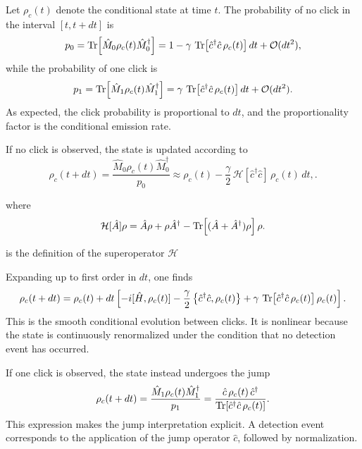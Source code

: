 Let \(\rho_c(t)\) denote the conditional state at time \(t\). The probability of no click in the interval \([t,t+dt]\) is
\begin{equation}
	p_0
	=
	\Tr\!\left[\hat M_0 \rho_c(t)\hat M_0^\dagger\right]
	=
	1-\gamma\,\Tr\!\left[\hat c^\dagger \hat c\,\rho_c(t)\right]dt
	+
	\mathcal{O}(dt^2),
	\label{eq:sme_photodetection_no_click_probability}
\end{equation}
while the probability of one click is
\begin{equation}
	p_1
	=
	\Tr\!\left[\hat M_1 \rho_c(t)\hat M_1^\dagger\right]
	=
	\gamma\,\Tr\!\left[\hat c^\dagger \hat c\,\rho_c(t)\right]dt
	+
	\mathcal{O}(dt^2).
	\label{eq:sme_photodetection_click_probability}
\end{equation}
As expected, the click probability is proportional to \(dt\), and the proportionality factor is the conditional emission rate.

If no click is observed, the state is updated according to
\begin{equation}
	\rho_c(t+dt)
	=
	\frac{\hat M_0 \rho_c(t)\hat M_0^\dagger}{p_0}
	\approx \rho_c(t) - \frac{\gamma}{2}\,\mathcal{H}[\hat c^\dagger \hat c]\,\rho_c(t)\,dt,
	.
	\label{eq:sme_photodetection_no_click_update_exact}
\end{equation}

where
\begin{equation}
	\mathcal{H}[\hat A]\rho
	=
	\hat A\rho+\rho \hat A^\dagger
	-
	\Tr\!\left[
	(\hat A+\hat A^\dagger)\rho
	\right]\rho.
	\label{eq:homodyne_H_superoperator_definition}
\end{equation}

is the definition of the superoperator $\mathcal{H}$

Expanding up to first order in \(dt\), one finds
\begin{equation}
	\rho_c(t+dt)
	=
	\rho_c(t)
	+
	dt
	\left[
	-i[\hat H,\rho_c(t)]
	-\frac{\gamma}{2}
	\left\{
	\hat c^\dagger \hat c,\rho_c(t)
	\right\}
	+
	\gamma\,\Tr\!\left[\hat c^\dagger \hat c\,\rho_c(t)\right]\rho_c(t)
	\right].
	\label{eq:sme_photodetection_no_click_update}
\end{equation}
This is the smooth conditional evolution between clicks. It is nonlinear because the state is continuously renormalized under the condition that no detection event has occurred.

If one click is observed, the state instead undergoes the jump
\begin{equation}
	\rho_c(t+dt)
	=
	\frac{\hat M_1 \rho_c(t)\hat M_1^\dagger}{p_1}
	=
	\frac{\hat c\,\rho_c(t)\,\hat c^\dagger}
	{\Tr\!\left[\hat c^\dagger \hat c\,\rho_c(t)\right]}.
	\label{eq:sme_photodetection_click_update}
\end{equation}
This expression makes the jump interpretation explicit. A detection event corresponds to the application of the jump operator \(\hat c\), followed by normalization.

